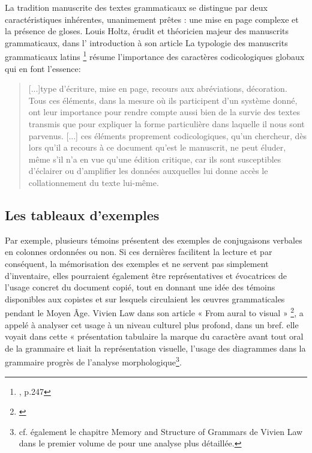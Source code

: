 \documentclass[a4paper, twoside, 12pt]{book}
\begin{document}
La tradition manuscrite des textes grammaticaux se distingue par deux caractéristiques inhérentes, unanimement prêtes : une mise en page complexe et la présence de gloses. Louis Holtz, érudit et théoricien majeur des manuscrits grammaticaux, dans l' introduction à son article \og{} La typologie des manuscrits grammaticaux latins \fg{} \footnote{\cite{holtz1978typologie}, p.247} résume l'importance des caractères codicologiques globaux qui en font l'essence:

\blockquote{[...]type d'écriture, mise en page, recours aux abréviations, décoration. Tous ces éléments, dans la mesure où ils participent d'un système donné, ont leur importance pour rendre compte aussi bien de la survie des textes transmis que pour expliquer la forme particulière dans laquelle il nous sont parvenus. [...] ces éléments proprement codicologiques, qu'un chercheur, dès lors qu'il a recours à ce document qu'est le manuscrit, ne peut éluder, même s'il n'a en vue qu'une édition critique, car ils sont susceptibles d'éclairer ou d'amplifier les données auxquelles lui donne accès le collationnement du texte lui-même.} 

\subsection{Les tableaux d'exemples}

Par exemple, plusieurs témoins présentent des exemples de conjugaisons verbales en colonnes ordonnées ou non. Si ces dernières facilitent la lecture et par conséquent, la mémorisation des exemples et ne servent pas simplement d’inventaire, elles pourraient également être représentatives et évocatrices de l’usage concret du document copié, tout en donnant une idée des témoins disponibles aux copistes et sur lesquels circulaient les œuvres grammaticales pendant le Moyen Âge. Vivien Law dans son article « From aural to visual » \footnote{\cite{law1997aural}}, a appelé à analyser cet usage à un niveau culturel plus profond, dans un bref. elle voyait dans cette « présentation tabulaire la marque du caractère avant tout oral de la grammaire et liait la représentation visuelle, l’usage des diagrammes dans la grammaire progrès de l’analyse morphologique\footnote{cf. également le chapitre \og{}Memory and Structure of Grammars\fg{} de Vivien Law dans le premier volume de \cite{denonnomanuscripts} pour une analyse plus détaillée.}.\\
\end{document}
